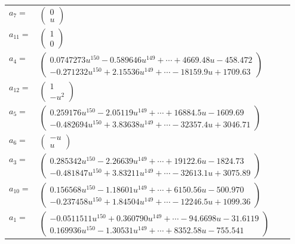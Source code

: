 \documentclass[1p]{elsarticle_modified}
\theoremstyle{definition}
\begin{document}
\begin{tabular}{m{7pt} m{180pt} m{7pt} m{180pt} }
\flushright $a_{7}=$&$\begin{pmatrix}0\\u\end{pmatrix}$ \\
\flushright $a_{11}=$&$\begin{pmatrix}1\\0\end{pmatrix}$ \\
\flushright $a_{4}=$&$\begin{pmatrix}0.0747273 u^{150}-0.589646 u^{149}+\cdots+4669.48 u-458.472\\-0.271232 u^{150}+2.15536 u^{149}+\cdots-18159.9 u+1709.63\end{pmatrix}$ \\
\flushright $a_{12}=$&$\begin{pmatrix}1\\- u^2\end{pmatrix}$ \\
\flushright $a_{5}=$&$\begin{pmatrix}0.259176 u^{150}-2.05119 u^{149}+\cdots+16884.5 u-1609.69\\-0.482694 u^{150}+3.83638 u^{149}+\cdots-32357.4 u+3046.71\end{pmatrix}$ \\
\flushright $a_{6}=$&$\begin{pmatrix}- u\\u\end{pmatrix}$ \\
\flushright $a_{3}=$&$\begin{pmatrix}0.285342 u^{150}-2.26639 u^{149}+\cdots+19122.6 u-1824.73\\-0.481847 u^{150}+3.83211 u^{149}+\cdots-32613.1 u+3075.89\end{pmatrix}$ \\
\flushright $a_{10}=$&$\begin{pmatrix}0.156568 u^{150}-1.18601 u^{149}+\cdots+6150.56 u-500.970\\-0.237458 u^{150}+1.84504 u^{149}+\cdots-12246.5 u+1099.36\end{pmatrix}$ \\
\flushright $a_{1}=$&$\begin{pmatrix}-0.0511511 u^{150}+0.360790 u^{149}+\cdots-94.6698 u-31.6119\\0.169936 u^{150}-1.30531 u^{149}+\cdots+8352.58 u-755.541\end{pmatrix}$ \\

\end{tabular}
\end{document}
